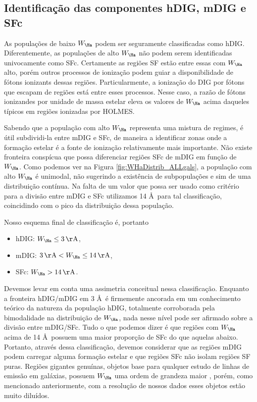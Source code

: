 \subsection{Identificação das componentes hDIG, mDIG e SFc}
\label{sec:DIGclass:identclass}

As populações de baixo $W_{\Ha}$ podem ser seguramente classificadas como hDIG. Diferentemente, as populações de alto $W_{\Ha}$ não podem serem identificadas univocamente como SFc. Certamente as regiões SF estão entre essas com $W_{\Ha}$ alto, porém outros processos de ionização podem guiar a disponibilidade de fótons ionizants dessas regiões. Particularmente, a ionização do DIG por fótons que escapam de regiões \hii está entre esses processos. Nesse caso, a razão de fótons ionizandes por unidade de massa estelar eleva os valores de $W_{\Ha}$ acima daqueles típicos em regiões ionizadas por HOLMES.

Sabendo que a população com alto $W_{\Ha}$ representa uma mistura de regimes, é útil subdividi-la entre mDIG e SFc, de maneira a identificar zonas onde a formação estelar é a fonte de ionização relativamente mais importante. Não existe fronteira conspícua que possa diferenciar regiões SFc de mDIG em função de $W_{\Ha}$. Como podemos ver na Figura \ref{fig:WHaDistrib_ALLgals}, a população com alto $W_{\Ha}$ é unimodal, não sugerindo a existência de subpopulações e sim de uma distribuição contínua. Na falta de um valor que possa ser usado como critério para a divisão entre mDIG e SFc utilizamos 14 \AA\ para tal classificação, coincidindo com o pico da distribuição dessa população.

Nosso esquema final de classificação é, portanto

\begin{itemize}
 \item hDIG: $W_{\Ha} \le 3 \,\mathrm{\AA}$,
 \item mDIG:  $3 \,\mathrm{\AA}  < W_{\Ha} \le 14 \,\mathrm{\AA}$,
 \item SFc: $W_{\Ha} > 14 \,\mathrm{\AA}$.
\end{itemize}

Devemos levar em conta uma assimetria conceitual nessa classificação. Enquanto a fronteira hDIG/mDIG em 3 \AA\ é firmemente ancorada em um conhecimento teórico da natureza da população hDIG, totalmente corroborada pela bimodalidade na distribuição de $W_{\Ha}$, nada nesse nível pode ser afirmado sobre a divisão entre mDIG/SFc. Tudo o que podemos dizer é que regiões com $W_{\Ha}$ acima de 14 \AA\ possuem uma maior proporção de SFc do que aquelas abaixo. Portanto, através dessa classificação, devemos considerar que as regiões mDIG podem carregar alguma formação estelar e que regiões SFc não isolam regiões SF puras. Regiões \hii gigantes genuínas, objetos base para qualquer estudo de linhas de emissão em galáxias, possuem $W_{\Ha}$ uma ordem de grandeza maior \citep{McCall.etal.1985, Garnett.and.Shields.1987, Kennicutt.and.Garnett.1996, Luridiana.and.Peimbert.2001, Bresolin.etal.2004}, porém, como mencionado anteriormente, com a resolução de nossos dados esses objetos estão muito diluídos.

